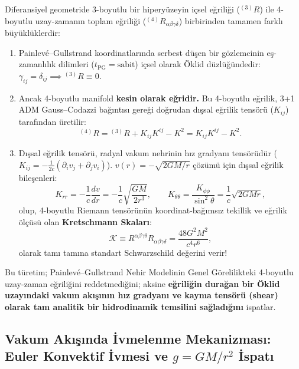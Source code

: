 \documentclass[11pt,a4paper]{article}
\begin{document}
Diferansiyel geometride 3-boyutlu bir hiperyüzeyin içsel eğriliği ($^{(3)}R$) ile 4-boyutlu uzay-zamanın toplam eğriliği ($^{(4)}R_{\alpha\beta\gamma\delta}$) birbirinden tamamen farklı büyüklüklerdir:
\begin{enumerate}
    \item Painlevé--Gullstrand koordinatlarında serbest düşen bir gözlemcinin eş-zamanlılık dilimleri ($t_{\mathrm{PG}} = \text{sabit}$) içsel olarak Öklid düzlüğündedir: $\gamma_{ij} = \delta_{ij} \implies {}^{(3)}R \equiv 0$.
    \item Ancak 4-boyutlu manifold \textbf{kesin olarak eğridir.} Bu 4-boyutlu eğrilik, 3+1 ADM Gauss--Codazzi bağıntısı gereği doğrudan dışsal eğrilik tensörü ($K_{ij}$) tarafından üretilir:
    \begin{equation}
        {}^{(4)}R = {}^{(3)}R + K_{ij} K^{ij} - K^2 = K_{ij} K^{ij} - K^2.
        \label{eq:gauss_codazzi_ispat}
    \end{equation}
    \item Dışsal eğrilik tensörü, radyal vakum nehrinin hız gradyanı tensörüdür ($K_{ij} = -\frac{1}{2c}(\partial_i v_j + \partial_j v_i)$). $v(r) = -\sqrt{2GM/r}$ çözümü için dışsal eğrilik bileşenleri:
    \begin{equation}
        K_{rr} = -\frac{1}{c} \frac{dv}{dr} = -\frac{1}{c} \sqrt{\frac{GM}{2r^3}}, \qquad K_{\theta\theta} = \frac{K_{\phi\phi}}{\sin^2\theta} = \frac{1}{c} \sqrt{2GMr},
    \end{equation}
    olup, 4-boyutlu Riemann tensörünün koordinat-bağımsız tekillik ve eğrilik ölçüsü olan \textbf{Kretschmann Skaları}:
    \begin{equation}
        \mathcal{K} \equiv R^{\alpha\beta\gamma\delta} R_{\alpha\beta\gamma\delta} = \frac{48 G^2 M^2}{c^4 r^6},
        \label{eq:kretschmann_ispat}
    \end{equation}
    olarak tamı tamına standart Schwarzschild değerini verir!
\end{enumerate}

Bu türetim; Painlevé--Gullstrand Nehir Modelinin Genel Görelilikteki 4-boyutlu uzay-zaman eğriliğini reddetmediğini; aksine \textbf{eğriliğin durağan bir Öklid uzayındaki vakum akışının hız gradyanı ve kayma tensörü (shear) olarak tam analitik bir hidrodinamik temsilini sağladığını} ispatlar.

\subsection{Vakum Akışında İvmelenme Mekanizması: Euler Konvektif İvmesi ve $g = GM/r^2$ İspatı}
\label{sec:ivmelenme_ispat_p1}
\end{document}
